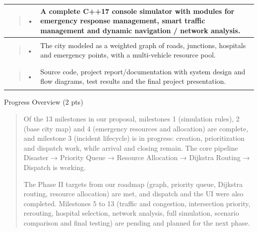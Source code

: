\documentclass[
]{article}
\newcounter{none} %
\begin{document}
{\def\LTcaptype{none} %
\begin{longtable}[]{@{}
  >{\raggedright\arraybackslash}p{}
  >{\raggedright\arraybackslash}p{}@{}}
\toprule\noalign{}
\begin{minipage}[b]{\linewidth}\raggedright
\begin{quote}
•
\end{quote}
\end{minipage} & \begin{minipage}[b]{\linewidth}\raggedright
A complete C++17 console simulator with modules for emergency response
management, smart traffic management and dynamic navigation / network
analysis.
\end{minipage} \\
\midrule\noalign{}
\endhead
\bottomrule\noalign{}
\endlastfoot
\begin{minipage}[t]{\linewidth}\raggedright
\begin{quote}
•
\end{quote}
\end{minipage} & The city modeled as a weighted graph of roads,
junctions, hospitals and emergency points, with a multi-vehicle resource
pool. \\
\begin{minipage}[t]{\linewidth}\raggedright
\begin{quote}
•
\end{quote}
\end{minipage} & Source code, project report/documentation with system
design and flow diagrams, test results and the final project
presentation. \\
\end{longtable}
}

Progress Overview (2 pts)

\begin{quote}
Of the 13 milestones in our proposal, milestones 1 (simulation rules), 2
(base city map) and 4 (emergency resources and allocation) are complete,
and milestone 3 (incident lifecycle) is in progress: creation,
prioritization and dispatch work, while arrival and closing remain. The
core pipeline Disaster → Priority Queue → Resource Allocation → Dijkstra
Routing → Dispatch is working.

The Phase II targets from our roadmap (graph, priority queue, Dijkstra
routing, resource allocation) are met, and dispatch and the UI were also
completed. Milestones 5 to 13 (traffic and congestion, intersection
priority, rerouting, hospital selection, network analysis, full
simulation, scenario comparison and final testing) are pending and
planned for the next phase.
\end{quote}
\end{document}
